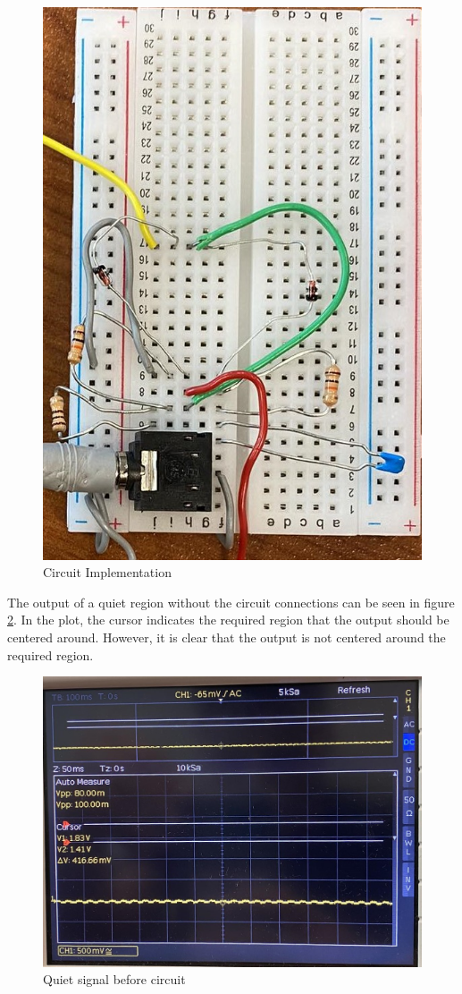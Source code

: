 \documentclass{cce2014-design}
\begin{document}
\begin{figure}[!h]
   \centering
   \includegraphics[width=0.8\linewidth]{circuit.jpg}
   \caption{Circuit Implementation}
   \label{fig:ciruitimplentation}
\end{figure}

\newpage

The output of a quiet region without the circuit connections can be seen in figure \ref*{fig:quietbeforecircuit}.
In the plot, the cursor indicates the required region that the output should be centered around.
However, it is clear that the output is not centered around the required region.

\vspace{1em}
\begin{figure}[!h]
   \centering
   \includegraphics[width=0.8\linewidth]{shifted_difference.jpg}
   \caption{Quiet signal before circuit}
   \label{fig:quietbeforecircuit}
\end{figure}
\vspace{1em}
\end{document}
